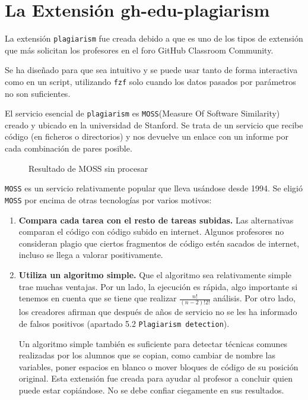 \section{La Extensión gh-edu-plagiarism}
La extensión \verb|plagiarism| fue creada debido a que es uno de los tipos de extensión que más solicitan los profesores en el foro GitHub Classroom Community.

Se ha diseñado para que sea intuitivo y se puede usar tanto de forma interactiva como en un script, utilizando \verb|fzf| solo cuando los datos pasados por parámetros no son suficientes.

El servicio esencial de \verb|plagiarism| es \verb|MOSS|(Measure Of Software Similarity)\cite{MOSS} creado y ubicado en la universidad de Stanford. Se trata de un servicio que recibe código (en ficheros o directorios) y nos devuelve un enlace con un informe por cada combinación de pares posible. 
\begin{figure}
    \centering
    \caption{Resultado de MOSS sin procesar}
    \label{fig:MOSSRaw}
\end{figure}

\verb|MOSS| es un servicio relativamente popular que lleva usándose desde 1994. Se eligió \verb|MOSS| por encima de otras tecnologías por varios motivos:
\begin{enumerate}
    \item \textbf{Compara cada tarea con el resto de tareas subidas.} Las alternativas comparan el código con código subido en internet. Algunos profesores no consideran plagio que ciertos fragmentos de código estén sacados de internet, incluso se llega a valorar positivamente.
    \item \textbf{Utiliza un algoritmo simple.} Que el algoritmo sea relativamente simple trae muchas ventajas. Por un lado, la ejecución es rápida, algo importante si tenemos en cuenta que se tiene que realizar \(\frac{n!}{(n-2)!2!}\) análisis. Por otro lado, los creadores afirman que después de años de servicio no se les ha informado de falsos positivos\cite{paper} (apartado 5.2 \verb|Plagiarism detection|).
    
    Un algoritmo simple también es suficiente para detectar técnicas comunes realizadas por los alumnos que se copian, como cambiar de nombre las variables, poner espacios en blanco o mover bloques de código de su posición original.
    Esta extensión fue creada para ayudar al profesor a concluir quien puede estar copiándose. No se debe confiar ciegamente en sus resultados.
\end{enumerate}


